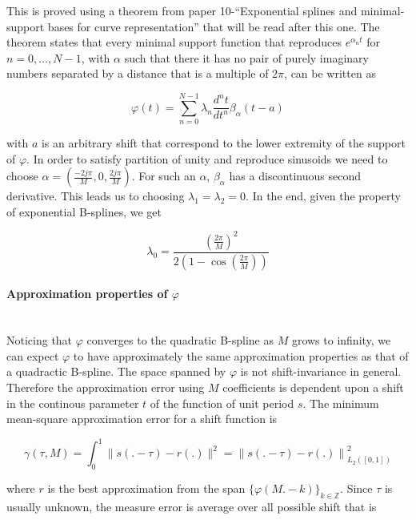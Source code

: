 \documentclass[a4paper, 11pt]{article}
\begin{document}
This is proved using a theorem from paper 10-“Exponential splines and minimal-support bases for curve representation” 
that will be read after this one. The theorem states that every minimal support function that reproduces $e^{\alpha_n 
t}$ for $n=0, \ldots, N-1$, with $\alpha$ such that there it has no pair of purely imaginary numbers separated by a 
distance that is a multiple of $2\pi$, can be written as

\begin{equation*}
  \varphi(t) = \sum_{n=0}^{N-1} \lambda_n \frac{d^n t}{dt^n}\beta_{\alpha}(t-a)
\end{equation*}

with $a$ is an arbitrary shift that correspond to the lower extremity of the support of $\varphi$. In order to satisfy 
partition of unity and reproduce sinusoids we need to choose $\alpha = (\frac{-2j\pi}{M}, 0,\frac{2j\pi}{M})$. For such 
an $\alpha$, $\beta_{\alpha}$ has a discontinuous second derivative. This leads us to choosing $\lambda_1 = \lambda_2 = 
0$. In the end, given the property of exponential B-splines, we get

\begin{equation}
  \lambda_0 = \frac{{(\frac{2\pi}{M})}^2}{2(1-\cos(\frac{2\pi}{M}))}
\end{equation}

\paragraph{Approximation properties of $\varphi$} \mbox{} \\

Noticing that $\varphi$ converges to the quadratic B-spline as $M$ grows to infinity, we can expect $\varphi$ to have 
approximately the same approximation properties as that of a quadractic B-spline. The space spanned by $\varphi$ is not 
shift-invariance in general. Therefore the approximation error using $M$ coefficients is dependent upon a shift in the 
continous parameter $t$ of the function of unit period $s$. The minimum mean-square approximation error for a shift 
function is

\begin{equation}
  \gamma(\tau, M) = \int_0^1 \| s(.-\tau) - r(.) \|^2 = {\| s(.-\tau) - r(.) \|}_{L_2([0,1])}^2 
\end{equation}

where $r$ is the best approximation from the span ${\{\varphi(M.-k)\}}_{k \in \mathbb{Z}}$. Since $\tau$ is usually 
unknown, the measure error is average over all possible shift that is
\end{document}
